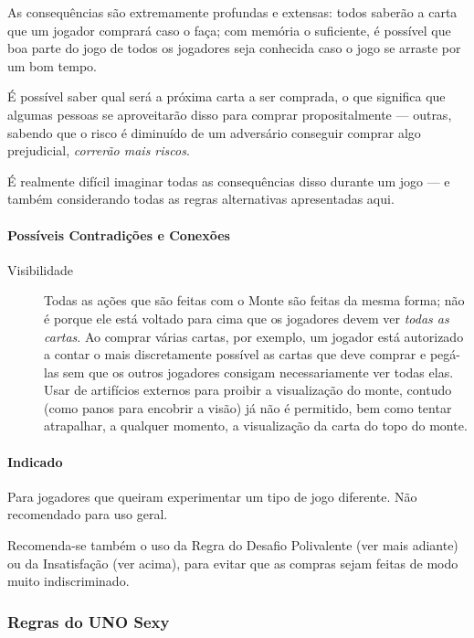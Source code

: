 As consequências são extremamente profundas e extensas: todos saberão a carta que um jogador comprará caso o faça; com memória o suficiente, é possível que boa parte do jogo de todos os jogadores seja conhecida caso o jogo se arraste por um bom tempo.

É possível saber qual será a próxima carta a ser comprada, o que significa que algumas pessoas se aproveitarão disso para comprar propositalmente --- outras, sabendo que o risco é diminuído de um adversário conseguir comprar algo prejudicial, \emph{correrão mais riscos}.

É realmente difícil imaginar todas as consequências disso durante um jogo --- e também considerando todas as regras alternativas apresentadas aqui.

\paragraph{Possíveis Contradições e Conexões}

\begin{description}
\item[Visibilidade]{Todas as ações que são feitas com o Monte são feitas da mesma forma; não é porque ele está voltado para cima que os jogadores devem ver \emph{todas as cartas}. Ao comprar várias cartas, por exemplo, um jogador está autorizado a contar o mais discretamente possível as cartas que deve comprar e pegá-las sem que os outros jogadores consigam necessariamente ver todas elas. Usar de artifícios externos para proibir a visualização do monte, contudo (como panos para encobrir a visão) já não é permitido, bem como tentar atrapalhar, a qualquer momento, a visualização da carta do topo do monte.}
\end{description}

\paragraph{Indicado} 

Para jogadores que queiram experimentar um tipo de jogo diferente. Não recomendado para uso geral.

Recomenda-se também o uso da Regra do Desafio Polivalente (ver mais adiante) ou da Insatisfação (ver acima), para evitar que as compras sejam feitas de modo muito indiscriminado.

\subsubsection{Regras do UNO Sexy}


